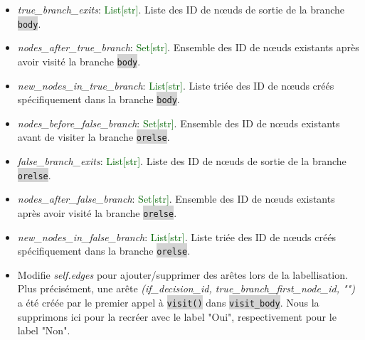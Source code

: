 \documentclass[11pt,a4paper]{article}
\newcommand{\code}[1]{\colorbox{lightgray}{\texttt{\small #1}}}
\newcommand{\var}[1]{\textit{#1}}
\newcommand{\vartype}[1]{\textcolor{darkgreen}{#1}}
\begin{document}
\begin{description}
\begin{itemize}
        \item \var{true\_branch\_exits}: \vartype{List[str]}. Liste des ID de nœuds de sortie de la branche \code{body}.
        \item \var{nodes\_after\_true\_branch}: \vartype{Set[str]}. Ensemble des ID de nœuds existants après avoir visité la branche \code{body}.
        \item \var{new\_nodes\_in\_true\_branch}: \vartype{List[str]}. Liste triée des ID de nœuds créés spécifiquement dans la branche \code{body}.
        \item \var{nodes\_before\_false\_branch}: \vartype{Set[str]}. Ensemble des ID de nœuds existants avant de visiter la branche \code{orelse}.
        \item \var{false\_branch\_exits}: \vartype{List[str]}. Liste des ID de nœuds de sortie de la branche \code{orelse}.
        \item \var{nodes\_after\_false\_branch}: \vartype{Set[str]}. Ensemble des ID de nœuds existants après avoir visité la branche \code{orelse}.
        \item \var{new\_nodes\_in\_false\_branch}: \vartype{List[str]}. Liste triée des ID de nœuds créés spécifiquement dans la branche \code{orelse}.
        \item Modifie \var{self.edges} pour ajouter/supprimer des arêtes lors de la labellisation. Plus précisément, une arête \var{(if\_decision\_id, true\_branch\_first\_node\_id, "")} a été créée par le premier appel à \code{visit()} dans \code{visit\_body}. Nous la supprimons ici pour la recréer avec le label "Oui", respectivement pour le label "Non".
    \end{itemize}
\end{description}
\end{document}

